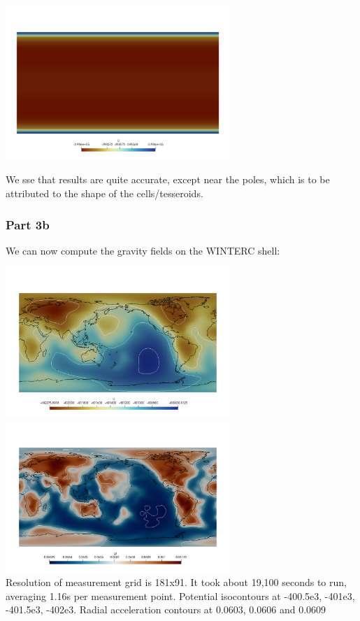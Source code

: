 \begin{center}
\includegraphics[width=8.5cm]{python_codes/fieldstone_98/images/benchconst/U.png}
\end{center}

We sse that results are quite accurate, except near the poles, which is to 
be attributed to the shape of the cells/tesseroids. 

\subsubsection*{Part 3b}
 
We can now compute the gravity fields on the WINTERC shell:

\begin{center}
\includegraphics[width=8.5cm]{python_codes/fieldstone_98/images/U}
\includegraphics[width=8.5cm]{python_codes/fieldstone_98/images/gr}\\
{\captionfont Resolution of measurement grid is 181x91. It took 
about 19,100 seconds to run, averaging 1.16s per measurement point.  
Potential isocontours at -400.5e3, -401e3, -401.5e3, -402e3. 
Radial acceleration contours at 0.0603, 0.0606 and 0.0609}
\end{center}

